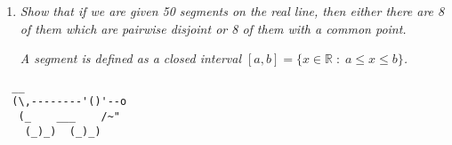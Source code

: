 \documentclass{article}
\begin{document}
\begin{enumerate}
\vspace{12pt}
\item %
\textit{Show that if we are given 50 segments on the real line, then either there are 8 of them which are pairwise disjoint or 8 of them with a common point.}

\textit{A segment is defined as a closed interval $[a, b] = \{x \in \mathbb{R} \;:\; a \leq x \leq b \}$.}




\end{enumerate}


\vspace{12pt}
\begin{center}
\begin{BVerbatim}
  __
  (\,--------'()'--o
   (_    ___    /~"
    (_)_)  (_)_)
\end{BVerbatim}
\end{center}
\end{document}
